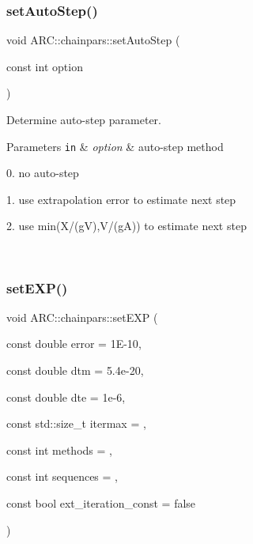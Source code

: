 \subsubsection{\texorpdfstring{set\+Auto\+Step()}{setAutoStep()}}
{\footnotesize\ttfamily void A\+R\+C\+::chainpars\+::set\+Auto\+Step (\begin{DoxyParamCaption}\item[{const int}]{option }\end{DoxyParamCaption})\hspace{0.3cm}{\ttfamily [inline]}}



Determine auto-\/step parameter. 


\begin{DoxyParams}[1]{Parameters}
\mbox{\tt in}  & {\em option} & auto-\/step method
\begin{DoxyItemize}
\item 0. no auto-\/step
\item 1. use extrapolation error to estimate next step
\item 2. use min(X/(gV),V/(gA)) to estimate next step 
\end{DoxyItemize}\\
\hline
\end{DoxyParams}
\hypertarget{classARC_1_1chainpars_a1bef542db30755ac35cf064446874f6d}{}\label{classARC_1_1chainpars_a1bef542db30755ac35cf064446874f6d} 
\subsubsection{\texorpdfstring{set\+E\+X\+P()}{setEXP()}}
{\footnotesize\ttfamily void A\+R\+C\+::chainpars\+::set\+E\+XP (\begin{DoxyParamCaption}\item[{const double}]{error = {\ttfamily 1E-\/10},  }\item[{const double}]{dtm = {\ttfamily 5.4e-\/20},  }\item[{const double}]{dte = {\ttfamily 1e-\/6},  }\item[{const std\+::size\+\_\+t}]{itermax = {},  }\item[{const int}]{methods = {},  }\item[{const int}]{sequences = {},  }\item[{const bool}]{ext\+\_\+iteration\+\_\+const = {\ttfamily false} }\end{DoxyParamCaption})\hspace{0.3cm}{\ttfamily [inline]}}



